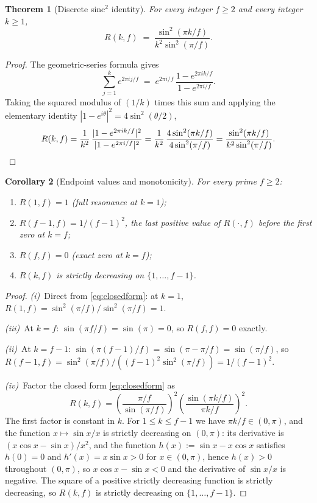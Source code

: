 \documentclass[11pt,reqno]{amsart}
\theoremstyle{plain}
\newtheorem{theorem}{Theorem}
\newtheorem{corollary}[theorem]{Corollary}
\theoremstyle{definition}
\theoremstyle{remark}
\begin{document}
\begin{theorem}[Discrete sinc${}^{2}$ identity]\label{thm:closedform}
For every integer $f \ge 2$ and every integer $k \ge 1$,
\begin{equation}\label{eq:closedform}
  R(k,f) \;=\; \frac{\sin^{2}(\pi k/f)}{k^{2}\sin^{2}(\pi/f)}.
\end{equation}
\end{theorem}

\begin{proof}
The geometric-series formula gives
\[
  \sum_{j=1}^{k}e^{2\pi i j/f}
  \;=\; e^{2\pi i/f}\,\frac{1-e^{2\pi i k/f}}{1-e^{2\pi i/f}}.
\]
Taking the squared modulus of $(1/k)$ times this sum and applying
the elementary identity $|1-e^{i\theta}|^{2} = 4\sin^{2}(\theta/2)$,
\[
  R(k,f)
  = \frac{1}{k^{2}}\,
    \frac{|1-e^{2\pi i k/f}|^{2}}{|1-e^{2\pi i/f}|^{2}}
  = \frac{1}{k^{2}}\,
    \frac{4\sin^{2}(\pi k/f)}{4\sin^{2}(\pi/f)}
  = \frac{\sin^{2}(\pi k/f)}{k^{2}\sin^{2}(\pi/f)}.
\qedhere
\]
\end{proof}

\begin{corollary}[Endpoint values and monotonicity]\label{cor:endpoints}
For every prime $f \ge 2$:
\begin{enumerate}[label={\upshape(\roman*)}]
\item $R(1,f) = 1$ (full resonance at $k = 1$);
\item $R(f-1,f) = 1/(f-1)^{2}$, the last positive value of
      $R(\cdot,f)$ before the first zero at $k=f$;
\item $R(f,f) = 0$ (exact zero at $k=f$);
\item $R(k,f)$ is strictly decreasing on $\{1,\dots,f-1\}$.
\end{enumerate}
\end{corollary}

\begin{proof}
\textit{(i)}\ Direct from \eqref{eq:closedform}: at $k=1$,
$R(1,f) = \sin^{2}(\pi/f)/\sin^{2}(\pi/f) = 1$.

\textit{(iii)}\ At $k=f$: $\sin(\pi f/f) = \sin(\pi) = 0$, so
$R(f,f) = 0$ exactly.

\textit{(ii)}\ At $k=f-1$: $\sin(\pi(f-1)/f) = \sin(\pi - \pi/f)
= \sin(\pi/f)$, so $R(f-1,f) = \sin^{2}(\pi/f)/((f-1)^{2}
\sin^{2}(\pi/f)) = 1/(f-1)^{2}$.

\textit{(iv)}\ Factor the closed form \eqref{eq:closedform} as
\[
  R(k,f) = \left(\frac{\pi/f}{\sin(\pi/f)}\right)^{2}
           \left(\frac{\sin(\pi k/f)}{\pi k/f}\right)^{2}.
\]
The first factor is constant in $k$. For $1\le k\le f-1$ we have
$\pi k/f\in(0,\pi)$, and the function $x \mapsto \sin x/x$ is strictly
decreasing on $(0,\pi)$: its derivative is
$(x\cos x - \sin x)/x^{2}$, and the function
$h(x):= \sin x - x\cos x$ satisfies $h(0)=0$ and
$h'(x) = x\sin x > 0$ for $x\in(0,\pi)$, hence $h(x) > 0$ throughout
$(0,\pi)$, so $x\cos x - \sin x < 0$ and the derivative of
$\sin x/x$ is negative. The square of a positive
strictly decreasing function is strictly decreasing, so $R(k,f)$ is
strictly decreasing on $\{1,\dots,f-1\}$.
\end{proof}
\end{document}
